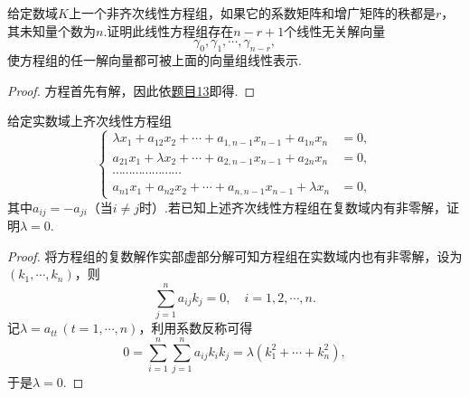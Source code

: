 \begin{prob}[14]
	给定数域$K$上一个非齐次线性方程组，如果它的系数矩阵和增广矩阵的秩都是$r$，其未知量个数为$n$.证明此线性方程组存在$n-r+1$个线性无关解向量
	\[\gamma_0,\gamma_1,\cdots,\gamma_{n-r},\]
	使方程组的任一解向量都可被上面的向量组线性表示.
\end{prob}
\begin{proof}
	方程首先有解，因此依\hyperlink{NormalSolutionNorm}{题目13}即得.
\end{proof}
\begin{prob}[16]
	给定实数域上齐次线性方程组
	\[\left\{
		\begin{array}{cc}
			\lambda x_1+a_{12}x_2+\cdots+a_{1,n-1}x_{n-1}+a_{1n}x_n & =0, \\
			a_{21}x_1+\lambda x_2+\cdots+a_{2,n-1}x_{n-1}+a_{2n}x_n & =0, \\
			\cdots\cdots\cdots\cdots\cdots\cdots\cdots              &     \\
			a_{n1}x_1+a_{n2}x_2+\cdots+a_{n,n-1}x_{n-1}+\lambda x_n & =0,
		\end{array}
		\right.\]
	其中$a_{ij}=-a_{ji}$（当$i\ne j$时）.若已知上述齐次线性方程组在复数域内有非零解，证明$\lambda=0$.
\end{prob}
\begin{proof}
	将方程组的复数解作实部虚部分解可知方程组在实数域内也有非零解，设为$(k_1,\cdots,k_n)$，则
	\[
		\sum_{j=1}^na_{ij}k_j=0,\quad i=1,2,\cdots,n.
	\]
	记$\lambda=a_{tt}\,(t=1,\cdots,n)$，利用系数反称可得
	\[
		0=\sum_{i=1}^n\sum_{j=1}^na_{ij}k_ik_j=\lambda(k_1^2+\cdots+k_n^2),
	\]
	于是$\lambda=0$.
\end{proof}

